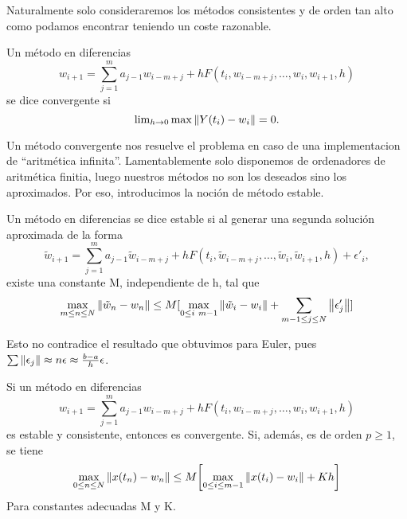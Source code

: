 Naturalmente solo consideraremos los métodos consistentes y de orden tan
alto como podamos encontrar teniendo un coste razonable.

\begin{definition}
    Un método en diferencias
    \begin{equation*}
        w_{i+1} = \sum_{j=1}^m {a_{j-1}w_{i-m+j}}
            + hF(t_i,w_{i-m+j}, \dots, w_i,w_{i+1},h)
    \end{equation*}
    se dice convergente si
    \begin{equation*}
        \lim\nolimits_{h \to 0} \max{\norm{Y(t_i)-w_i}} = 0.
    \end{equation*}
\end{definition}

Un método convergente nos resuelve el problema en caso de una
implementacion de ``aritmética infinita''.
Lamentablemente solo disponemos de ordenadores de aritmética finitia,
luego nuestros métodos no son los deseados sino los aproximados. %
Por eso, introducimos la noción de método estable.

\begin{definition}
    \newcommand{\tw}{\tilde{w}}

    Un método en diferencias se dice estable
    si al generar una segunda solución aproximada de la forma
    \begin{equation*}
        \tw_{i+1} = \sum_{j=1}^m {a_{j-1}\tw_{i-m+j}}
            + h F(t_i,\tw_{i-m+j}, \dots, \tw_i,\tw_{i+1},h) + \epsilon'_i,
    \end{equation*}
    existe una constante M, independiente de h, tal que
    \begin{equation*} \label{stab}
        \max_{m \leq n \leq N}{\norm{\tw_n - w_n}} \leq M[
            \max_{0 \leq i \ m-1}{\norm{\tw_i - w_i}}
            + \sum_{m-1 \leq j \leq N} \norm{\epsilon'_j}
        ]
    \end{equation*}
\end{definition}

\begin{remark}
    Esto no contradice el resultado que obtuvimos para Euler, pues
    $\sum\norm{\epsilon_j} \approx n\epsilon \approx \frac{b-a}{h}\epsilon$.
\end{remark}

\begin{theorem}
    Si un método en diferencias
    \begin{equation*}
        w_{i+1} = \sum_{j=1}^m {a_{j-1}w_{i-m+j}}
            + hF(t_i,w_{i-m+j}, \dots, w_i,w_{i+1},h)
    \end{equation*}
    es estable y consistente, entonces es convergente.
    Si, además, es de orden $p \geq 1$, se tiene
    \begin{equation*}
        \max_{0 \leq n \leq N}\norm{x(t_n) - w_n} \leq M\qty\bigg[
            \max_{0 \leq i \leq m-1} \norm{x(t_i) - w_i} + Kh
            ]
    \end{equation*}
    Para constantes adecuadas M y K.
\end{theorem}

